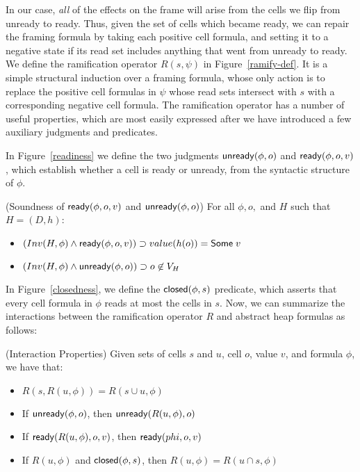 In our case, \emph{all} of the effects on the frame will arise from
the cells we flip from unready to ready. Thus, given the set of cells
which became ready, we can repair the framing formula by taking each
positive cell formula, and setting it to a negative state if its read
set includes anything that went from unready to ready. We define the
ramification operator $R(s, \psi)$ in Figure~\ref{ramify-def}.  It is
a simple structural induction over a framing formula, whose only
action is to replace the positive cell formulas in $\psi$ whose read
sets intersect with $s$ with a corresponding negative cell formula.
The ramification operator has a number of useful properties, which are
most easily expressed after we have introduced a few auxiliary
judgments and predicates.

In Figure~\ref{readiness} we define the two judgments $\mathsf{unready}({\phi}, {o})$
and $\mathsf{ready}({\phi}, {o}, {v})$, which establish whether a cell is ready or
unready, from the syntactic structure of $\phi$. 

\begin{prop}{(Soundness of $\mathsf{ready}({\phi}, {o}, {v})$ and $\mathsf{unready}({\phi}, {o})$)}
For all $\phi, o,$ and $H$ such that $H = (D,h)$:

\begin{itemize}
\item $(Inv(H, \phi) \land \mathsf{ready}({\phi}, {o}, {v})) \supset value(h(o)) = \mathsf{Some}\;v$
\item $(Inv(H, \phi) \land \mathsf{unready}({\phi}, {o})) \supset o \not\in V_H$
\end{itemize}
\end{prop}

In Figure~\ref{closedness}, we define the $\mathsf{closed}({\phi}, {s})$ predicate,
which asserts that every cell formula in $\phi$ reads at most the
cells in $s$. Now, we can summarize the interactions between the 
ramification operator $R$ and abstract heap formulas as follows: 

\begin{prop}{(Interaction Properties)}
Given sets of cells $s$ and $u$, cell $o$, value $v$, and formula $\phi$, we have
that:
\begin{itemize}
\item $R(s, R(u, \phi)) = R(s \cup u, \phi)$
\item If $\mathsf{unready}({\phi}, {o})$, then $\mathsf{unready}({R(u, \phi)}, {o})$ 
\item If $\mathsf{ready}({R(u, \phi)}, {o}, {v})$, then $\mathsf{ready}({phi}, {o}, {v})$ 
\item If $R(u, \phi)$ and $\mathsf{closed}({\phi}, {s})$, then $R(u, \phi) = R(u \cap s, \phi)$ 
\end{itemize}
\end{prop}

